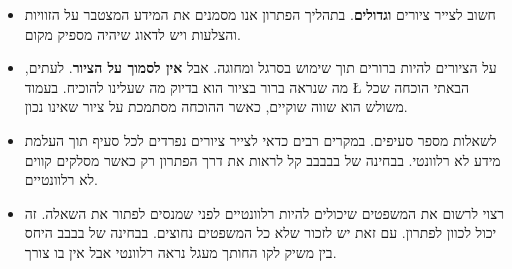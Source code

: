 \documentclass[12pt,a4paper]{article}
\begin{document}
\begin{itemize}
\item
חשוב לצייר ציורים 
\textbf{וגדולים}.
בתהליך הפתרון אנו מסמנים את המידע המצטבר על הזוויות והצלעות ויש לדאוג שיהיה מספיק מקום.

\item
על הציורים להיות ברורים תוך שימוש בסרגל ומחוגה. אבל 
\textbf{אין לסמוך על הציור}.
לעתים, מה שנראה ברור בציור הוא בדיוק מה שעלינו להוכיח. בעמוד 
\L{\pageref{}}
הבאתי הוכחה שכל משולש הוא שווה שוקיים, כאשר ההוכחה מסתמכת על ציור שאינו נכון.

\item
לשאלות מספר סעיפים. במקרים רבים כדאי לצייר ציורים נפרדים לכל סעיף תוך העלמת מידע לא רלוונטי. בבחינה של בבבבב קל לראות את דרך הפתרון רק כאשר מסלקים קווים לא רלוונטיים.

\item
רצוי לרשום את המשפטים שיכולים להיות רלוונטיים לפני שמנסים לפתור את השאלה. זה יכול לכוון לפתרון. עם זאת יש לזכור שלא כל המשפטים נחוצים. בבחינה של בבבב היחס בין משיק לקו החותך מעגל נראה רלוונטי אבל אין בו צורך.


\end{itemize}
\end{document}
